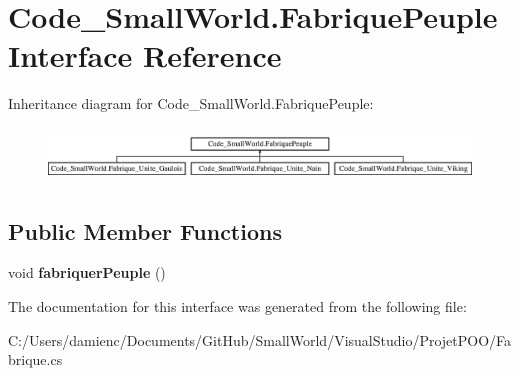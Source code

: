 \hypertarget{interface_code___small_world_1_1_fabrique_peuple}{\section{Code\-\_\-\-Small\-World.\-Fabrique\-Peuple Interface Reference}
\label{interface_code___small_world_1_1_fabrique_peuple}
}
Inheritance diagram for Code\-\_\-\-Small\-World.\-Fabrique\-Peuple\-:\begin{figure}[H]
\begin{center}
\leavevmode
\includegraphics[height=1.447028cm]{interface_code___small_world_1_1_fabrique_peuple}
\end{center}
\end{figure}
\subsection*{Public Member Functions}
\begin{DoxyCompactItemize}
\item 
\hypertarget{interface_code___small_world_1_1_fabrique_peuple_a06a04cf83d40339635793d765e2917d1}{void {\bfseries fabriquer\-Peuple} ()}\label{interface_code___small_world_1_1_fabrique_peuple_a06a04cf83d40339635793d765e2917d1}

\end{DoxyCompactItemize}


The documentation for this interface was generated from the following file\-:\begin{DoxyCompactItemize}
\item 
C\-:/\-Users/damienc/\-Documents/\-Git\-Hub/\-Small\-World/\-Visual\-Studio/\-Projet\-P\-O\-O/Fabrique.\-cs\end{DoxyCompactItemize}

